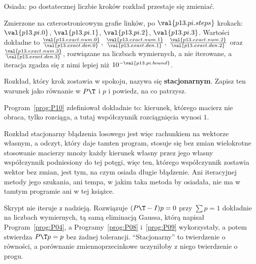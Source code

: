 \begin{fr}
\begin{ansblock}
Osiada: po dostatecznej liczbie kroków rozkład przestaje się zmieniać.
\end{ansblock}

Zmierzone na czterostronicowym grafie linków, po $\val{p13.pi.steps}$ krokach:
$\val{p13.pi.0}$, $\val{p13.pi.1}$, $\val{p13.pi.2}$, $\val{p13.pi.3}$.
Wartości dokładne to
$\frac{\val{p13.exact.num.0}}{\val{p13.exact.den.0}}$,
$\frac{\val{p13.exact.num.1}}{\val{p13.exact.den.1}}$,
$\frac{\val{p13.exact.num.2}}{\val{p13.exact.den.2}}$ oraz
$\frac{\val{p13.exact.num.3}}{\val{p13.exact.den.3}}$, rozwiązane na liczbach
wymiernych, a nie iterowane, a iteracja zgadza się z nimi lepiej niż
$10^{-\val{p13.pi.bound}}$.

Rozkład, który krok zostawia w spokoju, nazywa się \textbf{stacjonarnym}.
Zapisz ten warunek jako równanie w $P\T$ i $p$ i powiedz, na co patrzysz.
\dotline
\nextframe
\end{fr}

\begin{fr}
Program~\ref{prog:P10} zdefiniował dokładnie to: kierunek, którego macierz nie
obraca, tylko rozciąga, a tutaj współczynnik rozciągnięcia wynosi $1$.

Rozkład stacjonarny błądzenia losowego jest więc rachunkiem na wektorze
własnym, a odczyt, który daje tamten program, stosuje się bez zmian
\dash{} wielokrotne stosowanie macierzy mnoży każdy kierunek własny przez
jego własny współczynnik podniesiony do tej potęgi, więc ten, którego
współczynnik zostawia wektor bez zmian, jest tym, na czym osiada długie
błądzenie. Ani iteracyjnej metody jego szukania, ani tempa, w jakim taka
metoda by osiadała, nie ma w tamtym programie ani w tej książce.

\begin{note}
Skrypt nie iteruje z nadzieją. Rozwiązuje $(P\T - I)p = 0$ przy
$\sum p = 1$ dokładnie na liczbach wymiernych, tą samą eliminacją Gaussa,
którą napisał Program~\ref{prog:P04}, a Programy~\ref{prog:P08}
i~\ref{prog:P09} wykorzystały, a potem stwierdza $P\T p = p$ bez żadnej
tolerancji. \enquote{Stacjonarny} to twierdzenie o równości, a porównanie
zmiennoprzecinkowe uczyniłoby z niego twierdzenie o progu.
\end{note}
\end{fr}

